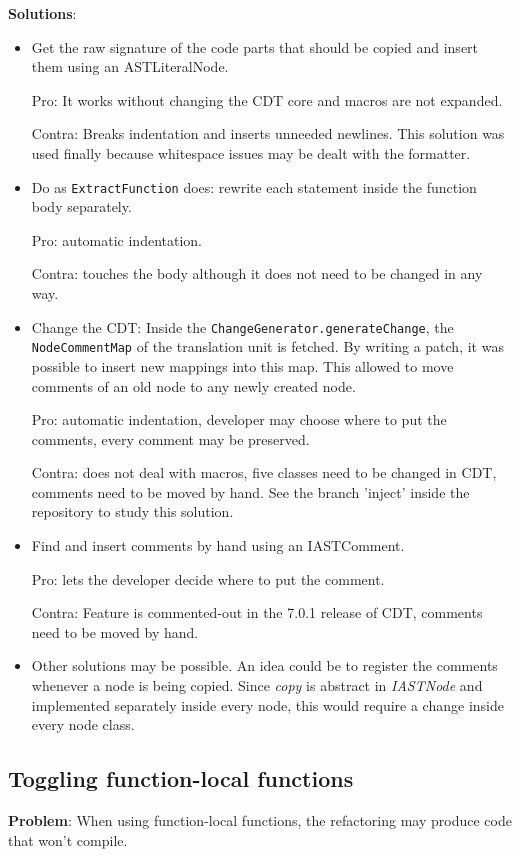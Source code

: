 \textbf{Solutions}:
\begin{itemize}
\item Get the raw signature of the code parts that should be copied and insert 
them using an ASTLiteralNode. 

Pro: It works without changing the CDT core and macros are not expanded. 

Contra: Breaks indentation and inserts unneeded newlines. This solution was used 
finally because whitespace issues may be dealt with the formatter.
\item Do as \texttt{ExtractFunction} does: rewrite each statement inside the 
function body separately. 

Pro: automatic indentation. 

Contra: touches the body although it does not need to be changed in any way. 
\item Change the CDT: Inside the \texttt{ChangeGenerator.generateChange}, the 
\texttt{NodeCommentMap} of the translation unit is fetched. By writing a patch, 
it was possible to insert new mappings into this map. This allowed to move 
comments of an old node to any newly created node. 

Pro: automatic indentation, developer may choose where to put the comments, 
every comment may be preserved. 

Contra: does not deal with macros, five classes need to be changed in CDT, 
comments need to be moved by hand. See the branch 'inject' inside the repository 
to study this solution.
\item Find and insert comments by hand using an IASTComment. 

Pro: lets the developer decide where to put the comment. 

Contra: Feature is commented-out in the 7.0.1 release of CDT, comments need to 
be moved by hand.
\item Other solutions may be possible. An idea could be to register the comments 
whenever a node is being copied. Since \textit{copy} is abstract in 
\textit{IASTNode} and implemented separately inside every node, this would 
require a change inside every node class.
\end{itemize}

\subsection{Toggling function-local functions}
\textbf{Problem}: When using function-local functions, the refactoring may 
produce code that won't compile.

